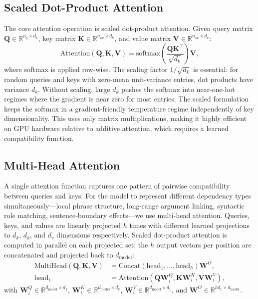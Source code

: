 ﻿\documentclass{article}
\begin{document}
\subsection{Scaled Dot-Product Attention}

The core attention operation is scaled dot-product attention. Given query matrix $\mathbf{Q} \in \mathbb{R}^{n_q \times d_k}$, key matrix $\mathbf{K} \in \mathbb{R}^{n_{kv} \times d_k}$, and value matrix $\mathbf{V} \in \mathbb{R}^{n_{kv} \times d_v}$:
\begin{equation}
\text{Attention}(\mathbf{Q}, \mathbf{K}, \mathbf{V}) = \text{softmax}\!\left(\frac{\mathbf{Q}\mathbf{K}^{\top}}{\sqrt{d_k}}\right)\mathbf{V},
\label{eq:attention}
\end{equation}
where softmax is applied row-wise. The scaling factor $1/\sqrt{d_k}$ is essential: for random queries and keys with zero-mean unit-variance entries, dot products have variance $d_k$. Without scaling, large $d_k$ pushes the softmax into near-one-hot regimes where the gradient is near zero for most entries. The scaled formulation keeps the softmax in a gradient-friendly temperature regime independently of key dimensionality. This uses only matrix multiplications, making it highly efficient on GPU hardware relative to additive attention, which requires a learned compatibility function.

\subsection{Multi-Head Attention}

A single attention function captures one pattern of pairwise compatibility between queries and keys. For the model to represent different dependency types simultaneously---local phrase structure, long-range argument linking, syntactic role matching, sentence-boundary effects---we use multi-head attention. Queries, keys, and values are linearly projected $h$ times with different learned projections to $d_k$, $d_k$, and $d_v$ dimensions respectively. Scaled dot-product attention is computed in parallel on each projected set; the $h$ output vectors per position are concatenated and projected back to $d_{\text{model}}$:
\begin{equation}
\begin{aligned}
\text{MultiHead}(\mathbf{Q}, \mathbf{K}, \mathbf{V}) &= \text{Concat}(\text{head}_1, \ldots, \text{head}_h) \mathbf{W}^{O}, \\
\text{head}_i &= \text{Attention}(\mathbf{Q}\mathbf{W}_i^{Q}, \mathbf{K}\mathbf{W}_i^{K}, \mathbf{V}\mathbf{W}_i^{V}),
\end{aligned}
\label{eq:multihead}
\end{equation}
with $\mathbf{W}_i^{Q} \in \mathbb{R}^{d_{\text{model}} \times d_k}$, $\mathbf{W}_i^{K} \in \mathbb{R}^{d_{\text{model}} \times d_k}$, $\mathbf{W}_i^{V} \in \mathbb{R}^{d_{\text{model}} \times d_v}$, and $\mathbf{W}^{O} \in \mathbb{R}^{h d_v \times d_{\text{model}}}$.
\end{document}
